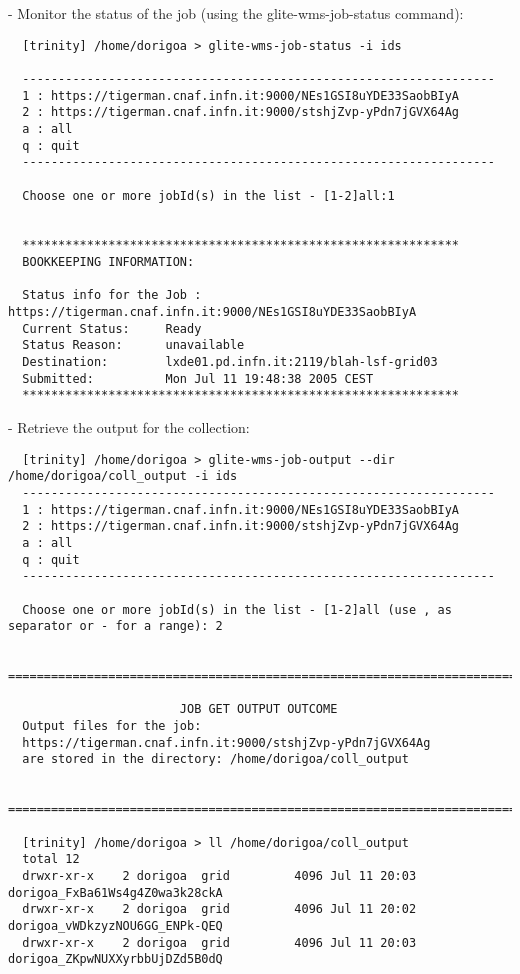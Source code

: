 - Monitor the status of the job (using the glite-wms-job-status command):
\begin{scriptsize}
\begin{verbatim}
  [trinity] /home/dorigoa > glite-wms-job-status -i ids 

  ------------------------------------------------------------------
  1 : https://tigerman.cnaf.infn.it:9000/NEs1GSI8uYDE33SaobBIyA
  2 : https://tigerman.cnaf.infn.it:9000/stshjZvp-yPdn7jGVX64Ag
  a : all
  q : quit
  ------------------------------------------------------------------

  Choose one or more jobId(s) in the list - [1-2]all:1


  *************************************************************
  BOOKKEEPING INFORMATION:

  Status info for the Job : https://tigerman.cnaf.infn.it:9000/NEs1GSI8uYDE33SaobBIyA
  Current Status:     Ready 
  Status Reason:      unavailable
  Destination:        lxde01.pd.infn.it:2119/blah-lsf-grid03
  Submitted:          Mon Jul 11 19:48:38 2005 CEST
  *************************************************************
\end{verbatim}
\end{scriptsize}

- Retrieve the output for the collection:
\begin{scriptsize}
\begin{verbatim}
  [trinity] /home/dorigoa > glite-wms-job-output --dir /home/dorigoa/coll_output -i ids 
  ------------------------------------------------------------------
  1 : https://tigerman.cnaf.infn.it:9000/NEs1GSI8uYDE33SaobBIyA
  2 : https://tigerman.cnaf.infn.it:9000/stshjZvp-yPdn7jGVX64Ag
  a : all
  q : quit
  ------------------------------------------------------------------

  Choose one or more jobId(s) in the list - [1-2]all (use , as separator or - for a range): 2

  ================================================================================

                        JOB GET OUTPUT OUTCOME
  Output files for the job:
  https://tigerman.cnaf.infn.it:9000/stshjZvp-yPdn7jGVX64Ag
  are stored in the directory: /home/dorigoa/coll_output

  ================================================================================

  [trinity] /home/dorigoa > ll /home/dorigoa/coll_output
  total 12
  drwxr-xr-x    2 dorigoa  grid         4096 Jul 11 20:03 dorigoa_FxBa61Ws4g4Z0wa3k28ckA
  drwxr-xr-x    2 dorigoa  grid         4096 Jul 11 20:02 dorigoa_vWDkzyzNOU6GG_ENPk-QEQ
  drwxr-xr-x    2 dorigoa  grid         4096 Jul 11 20:03 dorigoa_ZKpwNUXXyrbbUjDZd5B0dQ
\end{verbatim}
\end{scriptsize}


